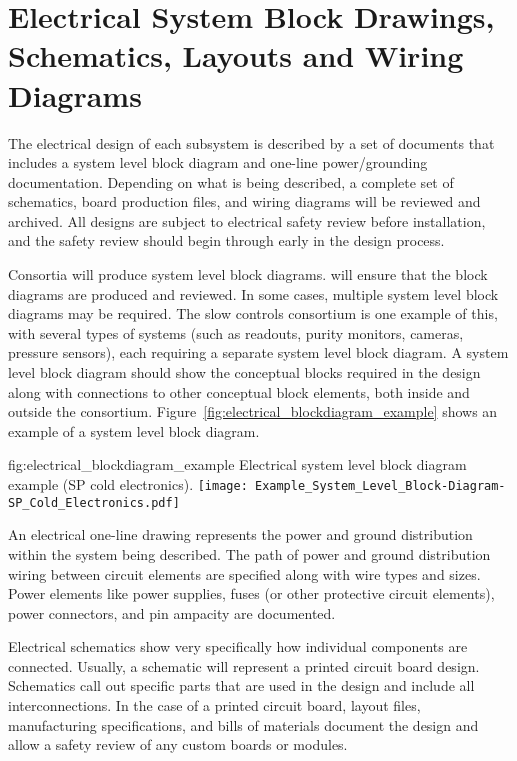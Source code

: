 \section{Electrical System Block Drawings, Schematics, Layouts and Wiring Diagrams}
\label{sec:fdsp-coord-electrical}


The electrical design of each subsystem is described by a
set of documents that includes a system level block
diagram and one-line power/grounding documentation.
Depending on what is being described, a complete set of schematics,
board production files, and wiring diagrams will be reviewed and archived.  All
designs are subject to electrical safety review before
installation, and the safety review should begin through
 early in the design process.


Consortia will produce system level block
diagrams.  will ensure that the
block diagrams are produced and reviewed.  In some cases, multiple
system level block diagrams may be required.  The slow controls consortium is one example of this, with several types of systems (such as 
readouts, purity monitors, cameras, pressure sensors), each
requiring a separate system level block diagram. A system level block
diagram should show the conceptual blocks required in the design along with connections to other conceptual block elements, both inside and outside the consortium.  
Figure~\ref{fig:electrical_blockdiagram_example} shows an example of a system level block diagram.
\begin{dunefigure}{fig:electrical_blockdiagram_example}
  {Electrical system level block diagram example (SP cold electronics).}
 \texttt{[image: Example\_System\_Level\_Block-Diagram-SP\_Cold\_Electronics.pdf]}
\end{dunefigure}


An electrical one-line drawing represents the power and ground
distribution within the system being described.  The path of power and
ground distribution wiring between circuit elements are
specified along with wire types and sizes.  Power elements like power supplies, fuses (or other protective circuit elements),
power connectors, and pin ampacity are documented.


Electrical schematics show very specifically how individual
components are connected.  Usually, a schematic will represent a
printed circuit board design.  Schematics call out specific
parts that are used in the design and include all interconnections.
In the case of a printed circuit board, layout files, manufacturing
specifications, and bills of materials document
the design and allow a safety review of any custom boards or
modules.


